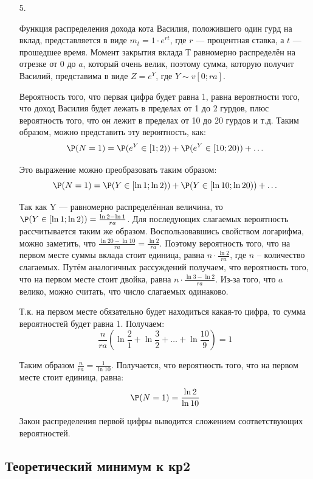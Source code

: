\begin{enumerate}
\begin{enumerate}
\item[5.]

Функция распределения дохода кота Василия, положившего один гурд на вклад, представляется в виде $m_t = 1\cdot e^{rt}$, где $r$ — процентная ставка, а $t$ — прошедшее время. Момент закрытия вклада Т равномерно распределён на отрезке от 0 до $a$, который очень велик, поэтому сумма, которую получит Василий, представима в виде $Z = e^{Y}$, где $Y \sim v[0; ra]$.

Вероятность того, что первая цифра будет равна 1, равна вероятности того, что доход Василия будет лежать в пределах от 1 до 2 гурдов, плюс вероятность того, что он лежит в пределах от 10 до 20 гурдов и т.д. Таким образом, можно представить эту вероятность, как:
\[
\P(N=1) = \P(e^Y \in [1;2) ) + \P(e^Y \in [10; 20) ) + \ldots
\]

Это выражение можно преобразовать таким образом:
\[
\P(N=1) = \P(Y \in [\ln 1; \ln2) ) + \P(Y \in [\ln 10; \ln 20) ) + \ldots
\]

Так как Y — равномерно распределённая величина, то $\P(Y \in [\ln 1; \ln2) ) = \frac{\ln 2 - \ln 1}{ra}$. Для последующих слагаемых вероятность рассчитывается таким же образом. Воспользовавшись свойством логарифма, можно заметить, что $\frac{\ln 20 - \ln 10}{ra} = \frac{\ln 2}{ra}$. Поэтому вероятность того, что на первом месте суммы вклада стоит единица, равна $n\cdot \frac{\ln 2}{ra}$, где $n$ -- количество слагаемых. Путём аналогичных рассуждений получаем, что вероятность того, что на первом месте стоит двойка, равна $n\cdot \frac{\ln 3- \ln 2}{ra}$. Из-за того, что $a$ велико, можно считать, что число слагаемых одинаково.

Т.к. на первом месте обязательно будет находиться какая-то цифра, то сумма вероятностей будет равна 1. Получаем:
\[
\dfrac{n}{ra}(\ln \frac{2}{1} + \ln \frac{3}{2} + \ldots + \ln \frac{10}{9}) = 1
\]

Таким образом $\frac{n}{ra} = \frac{1}{\ln 10}$. Получается, что вероятность того, что на первом месте стоит единица, равна:
\[
\P (N=1) = \dfrac{\ln 2}{\ln 10}
\]

Закон распределения первой цифры выводится сложением соответствующих вероятностей.

\end{enumerate}
\end{enumerate}



\subsection{Теоретический минимум к кр2}

